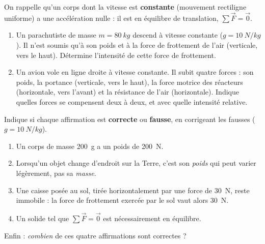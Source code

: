 \documentclass[11pt,a4paper]{article}
\newcommand{\vv}[1]{\vec{#1}}\newcommand{\ds}{\displaystyle}
\begin{document}
\begin{exo}
On rappelle qu'un corps dont la vitesse est \textbf{constante} (mouvement rectiligne uniforme) a une
accélération nulle : il est en équilibre de translation, $\sum\vv F=\vv 0$.
\begin{enumerate}[label=\alph*)]
  \item Un parachutiste de masse $m=\qty{80}{kg}$ descend à vitesse constante ($g=\qty{10}{N/kg}$).
        Il n'est soumis qu'à son poids et à la force de frottement de l'air (verticale, vers le haut).
        Détermine l'intensité de cette force de frottement.
  \item Un avion vole en ligne droite à vitesse constante. Il subit quatre forces : son poids, la
        portance (verticale, vers le haut), la force motrice des réacteurs (horizontale, vers l'avant)
        et la résistance de l'air (horizontale). Indique quelles forces se compensent deux à deux, et
        avec quelle intensité relative.
\end{enumerate}
\end{exo}

\begin{exo}
Indique si chaque affirmation est \textbf{correcte} ou \textbf{fausse}, en corrigeant les fausses
($g=\qty{10}{N/kg}$).
\begin{enumerate}[label=\alph*)]
  \item Un corps de masse \qty{200}{g} a un poids de \qty{200}{N}.
  \item Lorsqu'un objet change d'endroit sur la Terre, c'est son \emph{poids} qui peut varier
        légèrement, pas sa \emph{masse}.
  \item Une caisse posée au sol, tirée horizontalement par une force de \qty{30}{N}, reste immobile :
        la force de frottement exercée par le sol vaut alors \qty{30}{N}.
  \item Un solide tel que $\sum\vv F=\vv 0$ est nécessairement en équilibre.
\end{enumerate}
Enfin : \emph{combien} de ces quatre affirmations sont correctes ?
\end{exo}
\end{document}
